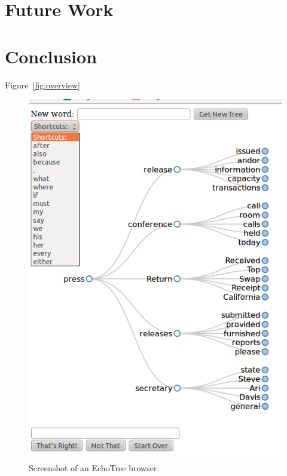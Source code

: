 \documentclass{sigchi}
\begin{document}
\section{Future Work}
\section{Conclusion}

Figure~\ref{fig:overview} 
\begin{figure}
   \centering
   \includegraphics[width=\columnwidth]{Figs/echoTreePulldownSnapshotSmall.png}
   \caption{Screenshot of an EchoTree browser.}
   \label{fig:echoTree}
\end{figure}
\end{document}

